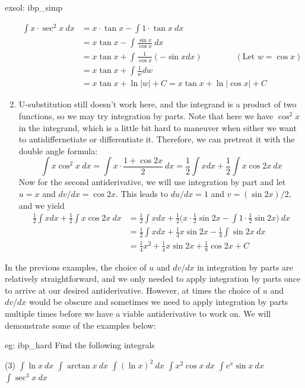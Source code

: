 \begin{exsol}[]{exsol: ibp_simp}
\begin{enumerate}
        \begin{align*}
            \int x \cdot \sec^2x~dx &= x \cdot \tan x - \int 1 \cdot \tan x~dx\\
            &= x \tan x - \int \frac{\sin x}{\cos x}~dx\\
            &= x \tan x + \int \frac{1}{\cos x} (-\sin x dx) \qquad \qquad (\text{Let }w = \cos x)\\
            &= x \tan x + \int \frac{1}{w} dw\\
            &= x \tan x + \ln |w| + C = x\tan x + \ln |\cos x| + C
        \end{align*}
        \item U-substitution still doesn't work here, and the integrand is a product of two functions, so we may try integration by parts.  Note that here we have $\cos^2x$ in the integrand, which is a little bit hard to maneuver when either we want to antidiffernetiate or differentiate it.  Therefore, we can pretreat it with the double angle formula:
        \[\int x \cos^2x~dx = \int x \cdot \frac{1+\cos 2x}{2}~ dx = \frac{1}{2}\int x dx +\frac{1}{2} \int x \cos 2x~dx\]
        Now for the second antiderivative, we will use integration by part and let $u = x$ and $dv/dx = \cos 2x$.  This leads to $du/dx = 1$ and $v = (\sin 2x)/2$, and we yield
        \begin{align*}
            \frac{1}{2}\int x dx +\frac{1}{2} \int x \cos 2x~dx &= \frac{1}{2}\int x dx + \frac{1}{2}\Big(x \cdot \frac{1}{2}\sin 2x - \int 1 \cdot \frac{1}{2}\sin 2x\Big)~dx\\
            &= \frac{1}{2}\int x dx + \frac{1}{4}x\sin 2x - \frac{1}{4}\int \sin 2x~dx\\
            &= \frac{1}{4}x^2 + \frac{1}{4}x\sin 2x + \frac{1}{8} \cos 2x + C
        \end{align*}
    \end{enumerate}
\end{exsol}

In the previous examples, the choice of $u$ and $dv/dx$ in integration by parts are relatively straightforward, and we only needed to apply integration by parts once to arrive at our desired antiderivative.  However, at times the choice of $u$ and $dv/dx$ would be obscure and sometimes we need to apply integration by parts multiple times before we have a viable antiderivative to work on.  We will demonstrate some of the examples below:

\begin{eg}[]{eg: ibp_hard}
    Find the following integrals
    \begin{tasks}(3)
        \task $\int \ln x~dx$
        \task $\int \arctan x~dx$
        \task $\int (\ln x)^2~dx$
        \task $\int x^2 \cos x~dx$
        \task $\int e^x \sin x~dx$
        \task $\int \sec^3 x~dx$
    \end{tasks}
\end{eg}

